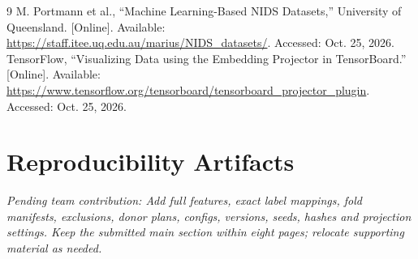 \documentclass[conference]{IEEEtran}
\newcommand{\pending}[1]{\par\noindent\textit{Pending team contribution: #1}\par}
\begin{document}
\begin{thebibliography}{9}
 M. Portmann et al., ``Machine Learning-Based NIDS Datasets,'' University of Queensland. [Online]. Available: \url{https://staff.itee.uq.edu.au/marius/NIDS_datasets/}. Accessed: Oct. 25, 2026.
 TensorFlow, ``Visualizing Data using the Embedding Projector in TensorBoard.'' [Online]. Available: \url{https://www.tensorflow.org/tensorboard/tensorboard_projector_plugin}. Accessed: Oct. 25, 2026.
\end{thebibliography}
\appendices
\section{Reproducibility Artifacts}
\pending{Add full features, exact label mappings, fold manifests, exclusions, donor plans, configs, versions, seeds, hashes and projection settings. Keep the submitted main section within eight pages; relocate supporting material as needed.}
\end{document}
